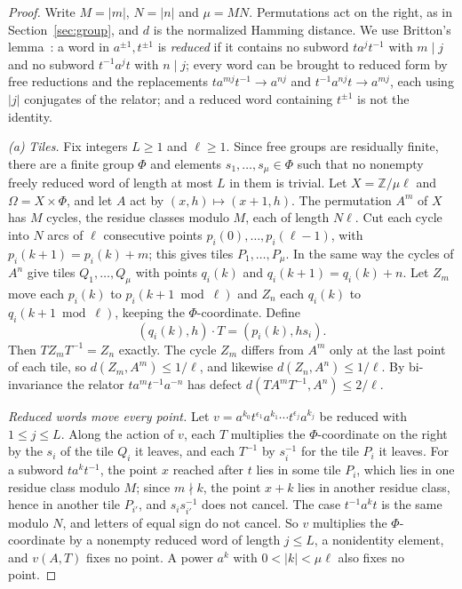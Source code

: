 \documentclass[11pt,a4paper]{article}
\theoremstyle{plain}
\theoremstyle{definition}
\theoremstyle{remark}
\begin{document}
\begin{proof}
Write $M=|m|$, $N=|n|$ and $\mu=MN$. Permutations act on the right, as in Section~\ref{sec:group}, and $d$ is the normalized Hamming distance.
We use Britton's lemma~\cite{LyndonSchupp1977}: a word in $a^{\pm1},t^{\pm1}$ is \emph{reduced} if it contains no subword $ta^jt^{-1}$ with
$m\mid j$ and no subword $t^{-1}a^jt$ with $n\mid j$; every word can be brought to reduced form by free reductions and the replacements
$ta^{mj}t^{-1}\to a^{nj}$ and $t^{-1}a^{nj}t\to a^{mj}$, each using $|j|$ conjugates of the relator; and a reduced word containing $t^{\pm1}$ is not
the identity.

\emph{(a)} \emph{Tiles.} Fix integers $L\ge1$ and $\ell\ge1$. Since free groups are residually finite, there are a finite group $\Phi$ and elements
$s_1,\dots,s_\mu\in\Phi$ such that no nonempty freely reduced word of length at most $L$ in them is trivial. Let $X=\mathbb Z/\mu\ell$ and
$\Omega=X\times\Phi$, and let $A$ act by $(x,h)\mapsto(x+1,h)$. The permutation $A^m$ of $X$ has $M$ cycles, the residue classes modulo $M$,
each of length $N\ell$. Cut each cycle into $N$ arcs of $\ell$ consecutive points $p_i(0),\dots,p_i(\ell-1)$, with $p_i(k+1)=p_i(k)+m$; this
gives tiles $P_1,\dots,P_\mu$. In the same way the cycles of $A^n$ give tiles $Q_1,\dots,Q_\mu$ with points $q_i(k)$ and $q_i(k+1)=q_i(k)+n$. Let
$Z_m$ move each $p_i(k)$ to $p_i(k+1\bmod\ell)$ and $Z_n$ each $q_i(k)$ to $q_i(k+1\bmod\ell)$, keeping the $\Phi$-coordinate. Define
\[
(q_i(k),h)\cdot T=(p_i(k),hs_i).
\]
Then $TZ_mT^{-1}=Z_n$ exactly. The cycle $Z_m$ differs from $A^m$ only at the last point of each tile, so $d(Z_m,A^m)\le1/\ell$, and likewise
$d(Z_n,A^n)\le1/\ell$. By bi-invariance the relator $ta^mt^{-1}a^{-n}$ has defect $d(TA^mT^{-1},A^n)\le2/\ell$.

\emph{Reduced words move every point.} Let $v=a^{k_0}t^{\epsilon_1}a^{k_1}\cdots t^{\epsilon_j}a^{k_j}$ be reduced with $1\le j\le L$. Along the
action of $v$, each $T$ multiplies the $\Phi$-coordinate on the right by the $s_i$ of the tile $Q_i$ it leaves, and each $T^{-1}$ by $s_i^{-1}$ for
the tile $P_i$ it leaves. For a subword $ta^kt^{-1}$, the point $x$ reached after $t$ lies in some tile $P_i$, which lies in one residue class modulo
$M$; since $m\nmid k$, the point $x+k$ lies in another residue class, hence in another tile $P_{i'}$, and $s_is_{i'}^{-1}$ does not cancel. The case
$t^{-1}a^kt$ is the same modulo $N$, and letters of equal sign do not cancel. So $v$ multiplies the $\Phi$-coordinate by a nonempty reduced word
of length $j\le L$, a nonidentity element, and $v(A,T)$ fixes no point. A power $a^k$ with $0<|k|<\mu\ell$ also fixes no point.


\end{proof}
\end{document}
